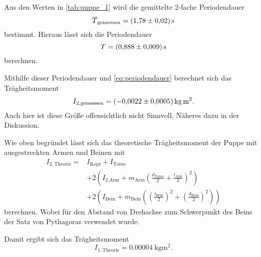Aus den Werten in \autoref{tab:puppe_1} wird die gemittelte 2-fache Periodendauer
\begin{equation}
    \overline{T}_\text{gemessen} = \SI{1.78+-0.02}{\second}
\end{equation}
bestimmt. Hieraus lässt sich die Periodendauer
\begin{equation}
    T = \SI{0.888+-0.009}{\second}
\end{equation}
berechnen.

Mithilfe dieser Periodendauer und \autoref{eq:periodendauer} berechnet sich das Trägheitsmoment
\begin{equation}
    I_{2,\text{gemessen}} = \SI{-0.0022+-0.0005}{\kilo\gram\meter\squared}.
\end{equation}
Auch hier ist diese Größe offensichtlich nicht Sinnvoll. Näheres dazu in der Diskussion.

Wie oben begründet lässt sich das theoretische Trägheitsmoment der Puppe mit ausgestreckten Armen und Beinen mit
\begin{equation}
    \begin{split}
        I_{2,\text{Theorie}} = {} & I_\text{Kopf} + I_\text{Torso} \\
        & + 2 \left( I_\text{2,Arm} + m_\text{Arm} \left(\frac{d_\text{Torso}}{2} + \frac{l_\text{Arm}}{2} \right)^2 \right) \\
        & + 2 \left( I_\text{Bein} + m_\text{Bein} \left( \left(\frac{l_\text{Bein}}{2}\right)^2 + \left(\frac{d_\text{Bein}}{2}\right)^2 \right) \right)
    \end{split}
\end{equation}
berechnen. Wobei für den Abstand von Drehachse zum Schwerpunkt des Beins der Satz von Pythagoras verwendet wurde.

Damit ergibt sich das Trägheitsmoment
\begin{equation}
    I_{1,\text{Theorie}} = \SI{0.00004}{\kilo\gram\meter\squared}.
\end{equation}